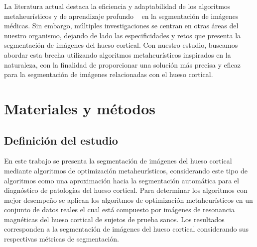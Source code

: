 \documentclass[conference]{IEEEtran}
\begin{document}
\noindent La literatura actual destaca la eficiencia y adaptabilidad de los algoritmos metaheurísticos y de aprendizaje profundo ~\cite{jones2023automated} en la segmentación de imágenes médicas. Sin embargo, múltiples investigaciones se centran en otras áreas del nuestro organismo, dejando de lado las especificidades y retos que presenta la segmentación de imágenes del hueso cortical. Con nuestro estudio, buscamos abordar esta brecha utilizando algoritmos metaheurísticos inspirados en la naturaleza, con la finalidad de proporcionar una solución más precisa y eficaz para la segmentación de imágenes relacionadas con el hueso cortical.









\section{Materiales y métodos}


\subsection{Definición del estudio}


\noindent En este trabajo se presenta la segmentación de imágenes del hueso cortical mediante algoritmos de optimización metaheurísticos, considerando este tipo de algoritmos como una aproximación hacia la segmentación automática para el diagnóstico de patologías del hueso cortical. Para determinar los algoritmos con mejor desempeño se aplican los algoritmos de optimización metaheurísticos en un conjunto de datos reales el cual está compuesto por imágenes de resonancia magnéticas del hueso cortical de sujetos de prueba sanos. Los resultados corresponden a la segmentación de imágenes del hueso cortical considerando sus respectivas métricas de segmentación.
\end{document}
